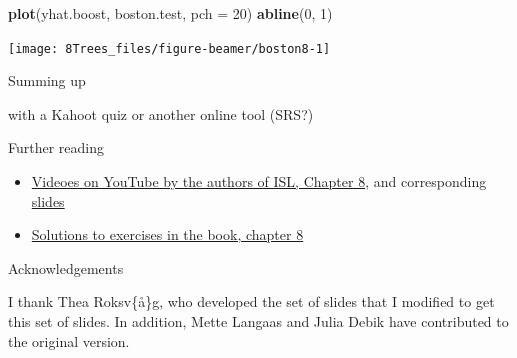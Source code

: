 \documentclass[10pt,ignorenonframetext,]{beamer}
\newenvironment{Shaded}{\begin{snugshade}}{\end{snugshade}}
\newcommand{\KeywordTok}[1]{\textcolor[rgb]{0.13,0.29,0.53}{\textbf{#1}}}
\newcommand{\DataTypeTok}[1]{\textcolor[rgb]{0.13,0.29,0.53}{#1}}
\newcommand{\DecValTok}[1]{\textcolor[rgb]{0.00,0.00,0.81}{#1}}
\newcommand{\NormalTok}[1]{#1}
\providecommand{\tightlist}{%
  \setlength{\itemsep}{0pt}\setlength{\parskip}{0pt}}
\begin{document}
\begin{frame}[fragile]

\scriptsize

\begin{Shaded}
\begin{Highlighting}[]
\KeywordTok{plot}\NormalTok{(yhat.boost, boston.test, }\DataTypeTok{pch =} \DecValTok{20}\NormalTok{)}
\KeywordTok{abline}\NormalTok{(}\DecValTok{0}\NormalTok{, }\DecValTok{1}\NormalTok{)}
\end{Highlighting}
\end{Shaded}

\begin{center}\texttt{[image: 8Trees\_files/figure-beamer/boston8-1]} \end{center}

\end{frame}

\begin{frame}{Summing up}

with a Kahoot quiz or another online tool (SRS?)

\end{frame}

\begin{frame}{Further reading}

\begin{itemize}
\tightlist
\item
  \href{https://www.youtube.com/playlist?list=PL5-da3qGB5IB23TLuA8ZgVGC8hV8ZAdGh}{Videoes
  on YouTube by the authors of ISL, Chapter 8}, and corresponding
  \href{https://lagunita.stanford.edu/c4x/HumanitiesScience/StatLearning/asset/trees.pdf}{slides}
\item
  \href{https://rstudio-pubs-static.s3.amazonaws.com/65564_925dfde884e14ef9b5735eddd16c263e.html}{Solutions
  to exercises in the book, chapter 8}
\end{itemize}

\end{frame}

\begin{frame}{Acknowledgements}

I thank Thea Roksv\{\aa\}g, who developed the set of slides that I
modified to get this set of slides. In addition, Mette Langaas and Julia
Debik have contributed to the original version.

\end{frame}
\end{document}
